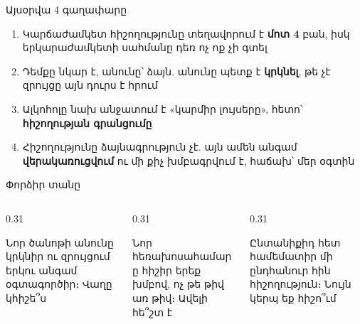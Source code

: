 \notopic

\begin{frame}{Այսօրվա 4 գաղափարը}
  \begin{enumerate}
    \item<1-> Կարճաժամկետ հիշողությունը տեղավորում է \textbf{մոտ 4} բան, իսկ երկարաժամկետի սահմանը դեռ ոչ ոք չի գտել
    \item<2-> Դեմքը նկար է, անունը՝ ձայն. անունը պետք է \textbf{կրկնել}, թե չէ զրույցը այն դուրս է հրում
    \item<3-> Ալկոհոլը նախ անջատում է «կարմիր լույսերը», հետո՝ \textbf{հիշողության գրանցումը}
    \item<4-> Հիշողությունը ձայնագրություն չէ. այն ամեն անգամ \textbf{վերակառուցվում} ու մի քիչ խմբագրվում է, հաճախ՝ մեր օգտին
  \end{enumerate}
\end{frame}

\begin{frame}{Փորձիր տանը}
  \begin{columns}[T]
    \begin{column}{0.31\textwidth}
      \begin{card}[colback=lavender!35!cardwhite]
        \centering{}\par\smallskip
        \raggedright Նոր ծանոթի անունը կրկնիր ու զրույցում երկու անգամ օգտագործիր։ Վաղը կհիշե՞ս
      \end{card}
    \end{column}
    \begin{column}{0.31\textwidth}
      \begin{card}[colback=mint!30!cardwhite]
        \centering{}\par\smallskip
        \raggedright Նոր հեռախոսահամարը հիշիր երեք խմբով, ոչ թե թիվ առ թիվ։ Ավելի հե՞շտ է
      \end{card}
    \end{column}
    \begin{column}{0.31\textwidth}
      \begin{card}[colback=peach!35!cardwhite]
        \centering{}\par\smallskip
        \raggedright Ընտանիքիդ հետ համեմատիր մի ընդհանուր հին հիշողություն։ Նույն կերպ եք հիշո՞ւմ
      \end{card}
    \end{column}
  \end{columns}
\end{frame}

